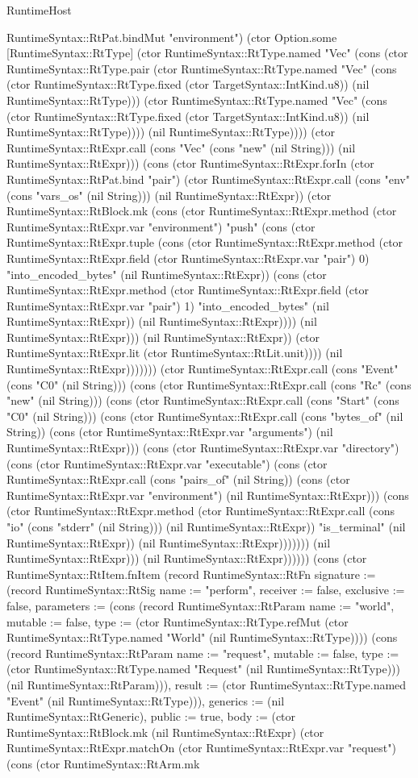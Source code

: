 \begin{lexlean}{RuntimeHost}
\begin{semanticmodule}
{RuntimeSyntax::RtPat.bindMut "environment") (ctor Option.some [RuntimeSyntax::RtType] (ctor RuntimeSyntax::RtType.named "Vec" (cons (ctor RuntimeSyntax::RtType.pair (ctor RuntimeSyntax::RtType.named "Vec" (cons (ctor RuntimeSyntax::RtType.fixed (ctor TargetSyntax::IntKind.u8)) (nil RuntimeSyntax::RtType))) (ctor RuntimeSyntax::RtType.named "Vec" (cons (ctor RuntimeSyntax::RtType.fixed (ctor TargetSyntax::IntKind.u8)) (nil RuntimeSyntax::RtType)))) (nil RuntimeSyntax::RtType)))) (ctor RuntimeSyntax::RtExpr.call (cons "Vec" (cons "new" (nil String))) (nil RuntimeSyntax::RtExpr))) (cons (ctor RuntimeSyntax::RtExpr.forIn (ctor RuntimeSyntax::RtPat.bind "pair") (ctor RuntimeSyntax::RtExpr.call (cons "env" (cons "vars_os" (nil String))) (nil RuntimeSyntax::RtExpr)) (ctor RuntimeSyntax::RtBlock.mk (cons (ctor RuntimeSyntax::RtExpr.method (ctor RuntimeSyntax::RtExpr.var "environment") "push" (cons (ctor RuntimeSyntax::RtExpr.tuple (cons (ctor RuntimeSyntax::RtExpr.method (ctor RuntimeSyntax::RtExpr.field (ctor RuntimeSyntax::RtExpr.var "pair") 0) "into_encoded_bytes" (nil RuntimeSyntax::RtExpr)) (cons (ctor RuntimeSyntax::RtExpr.method (ctor RuntimeSyntax::RtExpr.field (ctor RuntimeSyntax::RtExpr.var "pair") 1) "into_encoded_bytes" (nil RuntimeSyntax::RtExpr)) (nil RuntimeSyntax::RtExpr)))) (nil RuntimeSyntax::RtExpr))) (nil RuntimeSyntax::RtExpr)) (ctor RuntimeSyntax::RtExpr.lit (ctor RuntimeSyntax::RtLit.unit)))) (nil RuntimeSyntax::RtExpr))))))) (ctor RuntimeSyntax::RtExpr.call (cons "Event" (cons "C0" (nil String))) (cons (ctor RuntimeSyntax::RtExpr.call (cons "Rc" (cons "new" (nil String))) (cons (ctor RuntimeSyntax::RtExpr.call (cons "Start" (cons "C0" (nil String))) (cons (ctor RuntimeSyntax::RtExpr.call (cons "bytes_of" (nil String)) (cons (ctor RuntimeSyntax::RtExpr.var "arguments") (nil RuntimeSyntax::RtExpr))) (cons (ctor RuntimeSyntax::RtExpr.var "directory") (cons (ctor RuntimeSyntax::RtExpr.var "executable") (cons (ctor RuntimeSyntax::RtExpr.call (cons "pairs_of" (nil String)) (cons (ctor RuntimeSyntax::RtExpr.var "environment") (nil RuntimeSyntax::RtExpr))) (cons (ctor RuntimeSyntax::RtExpr.method (ctor RuntimeSyntax::RtExpr.call (cons "io" (cons "stderr" (nil String))) (nil RuntimeSyntax::RtExpr)) "is_terminal" (nil RuntimeSyntax::RtExpr)) (nil RuntimeSyntax::RtExpr))))))) (nil RuntimeSyntax::RtExpr))) (nil RuntimeSyntax::RtExpr))))})) (cons (ctor RuntimeSyntax::RtItem.fnItem (record RuntimeSyntax::RtFn {signature := (record RuntimeSyntax::RtSig {name := "perform", receiver := false, exclusive := false, parameters := (cons (record RuntimeSyntax::RtParam {name := "world", mutable := false, type := (ctor RuntimeSyntax::RtType.refMut (ctor RuntimeSyntax::RtType.named "World" (nil RuntimeSyntax::RtType)))}) (cons (record RuntimeSyntax::RtParam {name := "request", mutable := false, type := (ctor RuntimeSyntax::RtType.named "Request" (nil RuntimeSyntax::RtType))}) (nil RuntimeSyntax::RtParam))), result := (ctor RuntimeSyntax::RtType.named "Event" (nil RuntimeSyntax::RtType))}), generics := (nil RuntimeSyntax::RtGeneric), public := true, body := (ctor RuntimeSyntax::RtBlock.mk (nil RuntimeSyntax::RtExpr) (ctor RuntimeSyntax::RtExpr.matchOn (ctor RuntimeSyntax::RtExpr.var "request") (cons (ctor RuntimeSyntax::RtArm.mk }
\end{semanticmodule}
\end{lexlean}
